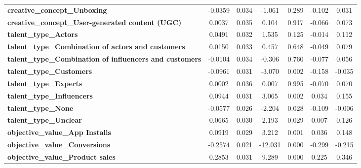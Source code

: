 \begin{center}
\begin{tabular}{lcccccc}
\textbf{creative\_concept\_Unboxing}                            &      -0.0359  &        0.034     &    -1.061  &         0.289        &       -0.102    &        0.031     \\
\textbf{creative\_concept\_User-generated content (UGC)}        &       0.0037  &        0.035     &     0.104  &         0.917        &       -0.066    &        0.073     \\
\textbf{talent\_type\_Actors}                                   &       0.0491  &        0.032     &     1.535  &         0.125        &       -0.014    &        0.112     \\
\textbf{talent\_type\_Combination of actors and customers}      &       0.0150  &        0.033     &     0.457  &         0.648        &       -0.049    &        0.079     \\
\textbf{talent\_type\_Combination of influencers and customers} &      -0.0104  &        0.034     &    -0.306  &         0.760        &       -0.077    &        0.056     \\
\textbf{talent\_type\_Customers}                                &      -0.0961  &        0.031     &    -3.070  &         0.002        &       -0.158    &       -0.035     \\
\textbf{talent\_type\_Experts}                                  &       0.0002  &        0.036     &     0.007  &         0.995        &       -0.070    &        0.070     \\
\textbf{talent\_type\_Influencers}                              &       0.0944  &        0.031     &     3.065  &         0.002        &        0.034    &        0.155     \\
\textbf{talent\_type\_None}                                     &      -0.0577  &        0.026     &    -2.204  &         0.028        &       -0.109    &       -0.006     \\
\textbf{talent\_type\_Unclear}                                  &       0.0665  &        0.030     &     2.193  &         0.029        &        0.007    &        0.126     \\
\textbf{objective\_value\_App Installs}                         &       0.0919  &        0.029     &     3.212  &         0.001        &        0.036    &        0.148     \\
\textbf{objective\_value\_Conversions}                          &      -0.2574  &        0.021     &   -12.031  &         0.000        &       -0.299    &       -0.215     \\
\textbf{objective\_value\_Product sales}                        &       0.2853  &        0.031     &     9.289  &         0.000        &        0.225    &        0.346     \\

\end{tabular}
\end{center}
